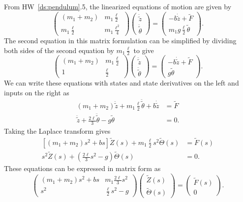 
From HW~\ref{ds:pendulum}.5, the linearized equations of motion are given by
\[
\begin{pmatrix} (m_1+m_2) & m_1 \frac{\ell}{2} \\
m_1 \frac{\ell}{2} & m_1 \frac{\ell^2}{4} \end{pmatrix}\begin{pmatrix}
\ddot{\tilde{z}} \\ \ddot{\tilde{\theta}} \end{pmatrix}  =
\begin{pmatrix} -b\dot{\tilde{z}} + \tilde{F} 
	  \\
	m_1 g \frac{\ell}{2} \tilde{\theta} \end{pmatrix}.
\]
%
The second equation in this matrix formulation can be simplified by dividing both sides of the second equation by $m_1 \frac{\ell}{2}$ to give
\[
\begin{pmatrix} (m_1+m_2) & m_1 \frac{\ell}{2} \\
1 &  \frac{\ell}{2} \end{pmatrix}\begin{pmatrix}
\ddot{\tilde{z}} \\ \ddot{\tilde{\theta}} \end{pmatrix}  =
\begin{pmatrix} -b\dot{\tilde{z}} + \tilde{F} 
	  \\
	g \tilde{\theta} \end{pmatrix}.
\]
%
We can write these equations with states and state derivatives on the left and inputs on the right as
\begin{align*}
(m_1+ m_2) \ddot{\tilde{z}} + m_1\frac{\ell}{2} \ddot{\tilde{\theta}} + b\dot{\tilde{z}} &= \tilde{F} \\
\ddot{\tilde{z}} + \frac{2\ell}{3} \ddot{\tilde{\theta}} - g{\tilde{\theta}} &= 0 .
\end{align*}
%
Taking the Laplace transform gives
\begin{align*}
\left[ (m_1+m_2) s^2 + b s \right] \tilde{Z}(s) + m_1\frac{\ell}{2} s^2 \tilde{\Theta}(s) &= \tilde{F}(s) \\
s^2 \tilde{Z}(s) + \left(\frac{2 \ell}{3} s^2 - g \right)\tilde{\Theta}(s) &= 0 .
\end{align*}
%
These equations can be expressed in matrix form as
\[
\begin{pmatrix} (m_1+m_2)s^2 + bs & m_1 \frac{2 \ell}{3}s^2 \\
s^2 & \frac{\ell}{2}s^2-g \end{pmatrix}\begin{pmatrix}
\tilde{Z}(s) \\ \tilde{\Theta}(s) \end{pmatrix}  =
\begin{pmatrix} \tilde{F}(s) \\
	0 \end{pmatrix}.
\]
